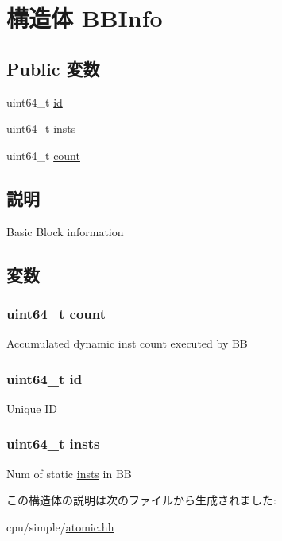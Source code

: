 \hypertarget{structAtomicSimpleCPU_1_1BBInfo}{
\section{構造体 BBInfo}
\label{structAtomicSimpleCPU_1_1BBInfo}
}
\subsection*{Public 変数}
\begin{DoxyCompactItemize}
\item 
uint64\_\-t \hyperlink{structAtomicSimpleCPU_1_1BBInfo_a7e290573ef1be67b92a2c745e3b00d1d}{id}
\item 
uint64\_\-t \hyperlink{structAtomicSimpleCPU_1_1BBInfo_a659dd2264a0d7ab44861e6ddb1a5073f}{insts}
\item 
uint64\_\-t \hyperlink{structAtomicSimpleCPU_1_1BBInfo_afcc68e9eec57ce069fcdc37815837d6d}{count}
\end{DoxyCompactItemize}


\subsection{説明}
Basic Block information 

\subsection{変数}
\hypertarget{structAtomicSimpleCPU_1_1BBInfo_afcc68e9eec57ce069fcdc37815837d6d}{
\subsubsection[{count}]{\setlength{\rightskip}{0pt plus 5cm}uint64\_\-t {\bf count}}}
\label{structAtomicSimpleCPU_1_1BBInfo_afcc68e9eec57ce069fcdc37815837d6d}
Accumulated dynamic inst count executed by BB \hypertarget{structAtomicSimpleCPU_1_1BBInfo_a7e290573ef1be67b92a2c745e3b00d1d}{
\subsubsection[{id}]{\setlength{\rightskip}{0pt plus 5cm}uint64\_\-t {\bf id}}}
\label{structAtomicSimpleCPU_1_1BBInfo_a7e290573ef1be67b92a2c745e3b00d1d}
Unique ID \hypertarget{structAtomicSimpleCPU_1_1BBInfo_a659dd2264a0d7ab44861e6ddb1a5073f}{
\subsubsection[{insts}]{\setlength{\rightskip}{0pt plus 5cm}uint64\_\-t {\bf insts}}}
\label{structAtomicSimpleCPU_1_1BBInfo_a659dd2264a0d7ab44861e6ddb1a5073f}
Num of static \hyperlink{namespaceinsts}{insts} in BB 

この構造体の説明は次のファイルから生成されました:\begin{DoxyCompactItemize}
\item 
cpu/simple/\hyperlink{atomic_8hh}{atomic.hh}\end{DoxyCompactItemize}
